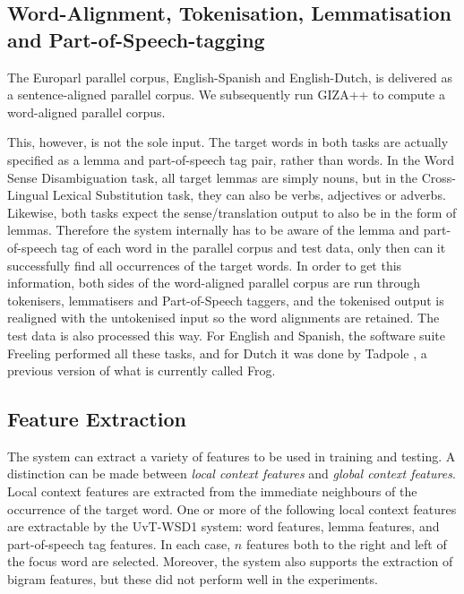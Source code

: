 \subsection{Word-Alignment, Tokenisation, Lemmatisation and Part-of-Speech-tagging}

The Europarl parallel corpus, English-Spanish and English-Dutch, is delivered
as a sentence-aligned parallel corpus. We subsequently run GIZA++ \citep{GIZA}
to compute a word-aligned parallel corpus.

This, however, is not the sole input. The target words in both tasks are
actually specified as a lemma and part-of-speech tag pair, rather than words.
In the Word Sense Disambiguation task, all target lemmas are simply nouns, but
in the Cross-Lingual Lexical Substitution task, they can also be verbs,
adjectives or adverbs. Likewise, both tasks expect the sense/translation output
to also be in the form of lemmas. Therefore the system internally has to be
aware of the lemma and part-of-speech tag of each word in the parallel corpus
and test data, only then can it successfully find all occurrences of the target
words. In order to get this information, both sides of the word-aligned
parallel corpus are run through tokenisers, lemmatisers and Part-of-Speech
taggers, and the tokenised output is realigned with the untokenised input so
the word alignments are retained. The test data is also processed this way. For
English and Spanish, the software suite Freeling \citep{FREELING} performed all
these tasks, and for Dutch it was done by Tadpole \citep{TADPOLE}, a previous
version of what is currently called Frog.

\subsection{Feature Extraction}
\label{sec:features}

The system can extract a variety of features to be used in training and
testing. A distinction can be made between \emph{local context features} and
\emph{global context features}. Local context features are extracted from the
immediate neighbours of the occurrence of the target word. One or more of the
following local context features are extractable by the UvT-WSD1 system: word
features, lemma features, and part-of-speech tag features. In each case, $n$
features both to the right and left of the focus word are selected. Moreover,
the system also supports the extraction of bigram features, but these did not
perform well in the experiments.

